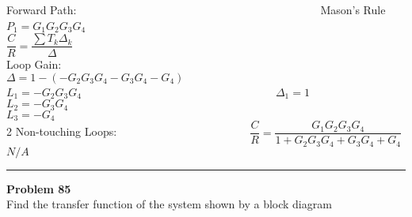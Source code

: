 \documentclass[11pt,letterpaper]{article}
\begin{document}
Forward Path:~~~~~~~~~~~~~~~~~~~~~~~~~~~~~~~~~~~~~~~~~~~~Mason's Rule \\                               

$P_1=G_1G_2G_3G_4$~~~~~~~~~~~~~~~~~~~~~~~~~~~~~~~~~~~~~~~~~~~~~~~~~$\dfrac{C}{R}=\dfrac{\sum T_k\Delta_k}{\Delta}$ \\   


Loop Gain:~~~~~~~~~~~~~~~~~~~~~~~~~~~~~~~~~~~~~~~~~$\Delta=1-(-G_2G_3G_4-G_3G_4-G_4)$\\
$L_1=-G_2G_3G_4$~~~~~~~~~~~~~~~~~~~~~~~~~~~~~~~~~~~$\Delta_1=1$\\
$L_2=-G_3G_4$\\
$L_3=-G_4$\\

2 Non-touching Loops:~~~~~~~~~~~~~~~~~~~~~~~~$\dfrac{C}{R}=\dfrac{G_1G_2G_3G_4}{1+G_2G_3G_4+G_3G_4+G_4}$\\

$N/A$

\clearpage
\rule{\textwidth}{1pt}
\textbf{Problem 85}\\
Find the transfer function of the system shown by a block diagram \\
\end{document}
